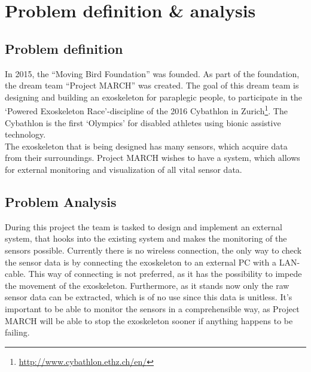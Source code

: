 \section{Problem definition \& analysis}
\subsection{Problem definition}
In 2015, the ``Moving Bird Foundation'' was founded. As part of the foundation, the dream team ``Project MARCH'' was created. The goal of this dream team is designing and building an exoskeleton for paraplegic people, to participate in the `Powered Exoskeleton Race'-discipline of the 2016 Cybathlon in Zurich\footnote{\url{http://www.cybathlon.ethz.ch/en/}}. The Cybathlon is the first `Olympics' for disabled athletes using bionic assistive technology.\\ 
The exoskeleton that is being designed has many sensors, which acquire data from their surroundings. Project MARCH wishes to have a system, which allows for external monitoring and visualization of all vital sensor data.

\subsection{Problem Analysis}
During this project the team is tasked to design and implement an external system, that hooks into the existing system and makes the monitoring of the sensors possible. Currently there is no wireless connection, the only way to check the sensor data is by connecting the exoskeleton to an external PC with a LAN-cable. This way of connecting is not preferred, as it has the possibility to impede the movement of the exoskeleton. Furthermore, as it stands now only the raw sensor data can be extracted, which is of no use since this data is unitless. It's important to be able to monitor the sensors in a comprehensible way, as Project MARCH will be able to stop the exoskeleton sooner if anything happens to be failing.